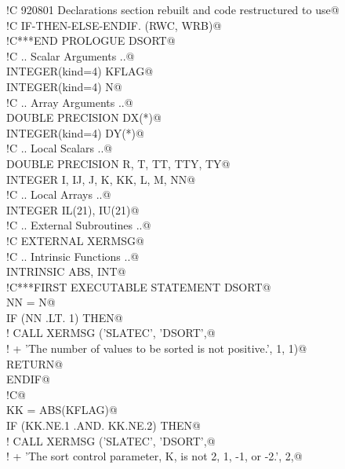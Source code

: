 \documentclass[10pt,a4paper,notitlepage]{article}
\begin{document}
\begin{flushleft}
\begin{list}{}{}
\mbox{}\verb@!C   920801  Declarations section rebuilt and code restructured to use@\\
\mbox{}\verb@!C           IF-THEN-ELSE-ENDIF.  (RWC, WRB)@\\
\mbox{}\verb@!C***END PROLOGUE  DSORT@\\
\mbox{}\verb@!C     .. Scalar Arguments ..@\\
\mbox{}\verb@      INTEGER(kind=4) KFLAG@\\
\mbox{}\verb@      INTEGER(kind=4) N@\\
\mbox{}\verb@!C     .. Array Arguments ..@\\
\mbox{}\verb@      DOUBLE PRECISION DX(*)@\\
\mbox{}\verb@      INTEGER(kind=4) DY(*)@\\
\mbox{}\verb@!C     .. Local Scalars ..@\\
\mbox{}\verb@      DOUBLE PRECISION R, T, TT, TTY, TY@\\
\mbox{}\verb@      INTEGER I, IJ, J, K, KK, L, M, NN@\\
\mbox{}\verb@!C     .. Local Arrays ..@\\
\mbox{}\verb@      INTEGER IL(21), IU(21)@\\
\mbox{}\verb@!C     .. External Subroutines ..@\\
\mbox{}\verb@!C      EXTERNAL XERMSG@\\
\mbox{}\verb@!C     .. Intrinsic Functions ..@\\
\mbox{}\verb@      INTRINSIC ABS, INT@\\
\mbox{}\verb@!C***FIRST EXECUTABLE STATEMENT  DSORT@\\
\mbox{}\verb@      NN = N@\\
\mbox{}\verb@      IF (NN .LT. 1) THEN@\\
\mbox{}\verb@!         CALL XERMSG ('SLATEC', 'DSORT',@\\
\mbox{}\verb@!     +      'The number of values to be sorted is not positive.', 1, 1)@\\
\mbox{}\verb@         RETURN@\\
\mbox{}\verb@      ENDIF@\\
\mbox{}\verb@!C@\\
\mbox{}\verb@      KK = ABS(KFLAG)@\\
\mbox{}\verb@      IF (KK.NE.1 .AND. KK.NE.2) THEN@\\
\mbox{}\verb@!         CALL XERMSG ('SLATEC', 'DSORT',@\\
\mbox{}\verb@!     +      'The sort control parameter, K, is not 2, 1, -1, or -2.', 2,@\\

\end{list}
\end{flushleft}
\end{document}
